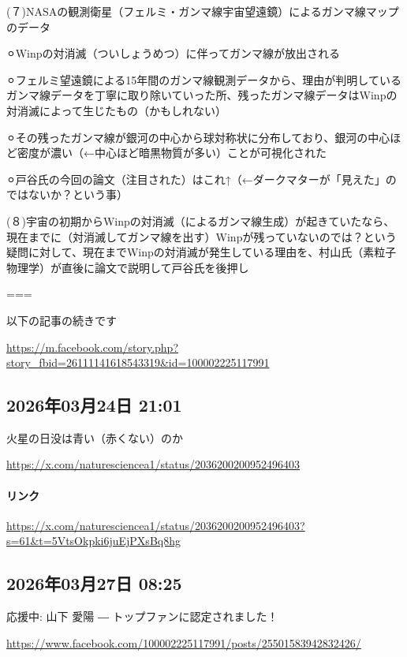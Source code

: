 \documentclass[facebook_diary.tex]{subfiles}
\begin{document}
(７)NASAの観測衛星（フェルミ・ガンマ線宇宙望遠鏡）によるガンマ線マップのデータ

⚪︎Winpの対消滅（ついしょうめつ）に伴ってガンマ線が放出される

⚪︎フェルミ望遠鏡による15年間のガンマ線観測データから、理由が判明しているガンマ線データを丁寧に取り除いていった所、残ったガンマ線データはWinpの対消滅によって生じたもの（かもしれない）

⚪︎その残ったガンマ線が銀河の中心から球対称状に分布しており、銀河の中心ほど密度が濃い（←中心ほど暗黒物質が多い）ことが可視化された

⚪︎戸谷氏の今回の論文（注目された）はこれ↑（←ダークマターが「見えた」のではないか？という事）


(８)宇宙の初期からWinpの対消滅（によるガンマ線生成）が起きていたなら、現在までに（対消滅してガンマ線を出す）Winpが残っていないのでは？という疑問に対して、現在までWinpの対消滅が発生している理由を、村山氏（素粒子物理学）が直後に論文で説明して戸谷氏を後押し


===

以下の記事の続きです

\url{https://m.facebook.com/story.php?story_fbid=26111141618543319&id=100002225117991}



\subsection*{2026年03月24日 21:01}

火星の日没は青い（赤くない）のか


\url{https://x.com/naturesciencea1/status/2036200200952496403}



\paragraph{リンク}
\url{https://x.com/naturesciencea1/status/2036200200952496403?s=61&t=5VtsOkpki6juEjPXsBq8hg}

\subsection*{2026年03月27日 08:25}

応援中: 山下 愛陽 ― トップファンに認定されました！🎉


\url{https://www.facebook.com/100002225117991/posts/25501583942832426/}
\end{document}
